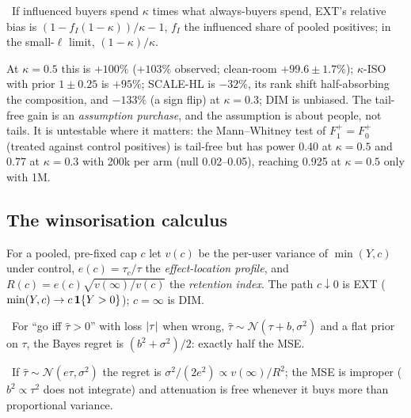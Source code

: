 \begin{proposition}
\label{ht:prop:comp}
\tagEstablished\ If influenced buyers spend $\kappa$ times what always-buyers spend, EXT's relative bias is $(1 - f_I(1 - \kappa))/\kappa - 1$, $f_I$ the influenced share of pooled positives; in the small-$\ell$ limit, $(1 - \kappa)/\kappa$.
\end{proposition}

At $\kappa = 0.5$ this is $+100\%$ ($+103\%$ observed; clean-room $+99.6 \pm 1.7\%$); $\kappa$-ISO with prior $1 \pm 0.25$ is $+95\%$; SCALE-HL is $-32\%$, its rank shift half-absorbing the composition, and $-133\%$ (a sign flip) at $\kappa = 0.3$; DIM is unbiased. The tail-free gain is an \emph{assumption purchase}, and the assumption is about people, not tails. It is untestable where it matters: the Mann--Whitney test of $F_1^+ = F_0^+$ (treated against control positives) is tail-free but has power 0.40 at $\kappa = 0.5$ and 0.77 at $\kappa = 0.3$ with 200k per arm (null 0.02--0.05), reaching 0.925 at $\kappa = 0.5$ only with 1M.

\subsection{The winsorisation calculus}

\begin{definition}
\label{ht:def:retention}
For a pooled, pre-fixed cap $c$ let $v(c)$ be the per-user variance of $\min(Y, c)$ under control, $e(c) = \tau_c/\tau$ the \emph{effect-location profile}, and $R(c) = e(c)\sqrt{v(\infty)/v(c)}$ the \emph{retention index}. The path $c \downarrow 0$ is EXT ($\min(Y, c) \to c\,\mathbf{1}\{Y > 0\}$); $c = \infty$ is DIM.
\end{definition}

\begin{lemma}
\label{ht:lem:A}
\tagEstablished\ For ``go iff $\hat\tau > 0$'' with loss $\left|\tau\right|$ when wrong, $\hat\tau \sim \mathcal N(\tau + b, \sigma^2)$ and a flat prior on $\tau$, the Bayes regret is $(b^2 + \sigma^2)/2$: exactly half the MSE.
\end{lemma}

\begin{lemma}
\label{ht:lem:B}
\tagEstablished\ If $\hat\tau \sim \mathcal N(e\tau, \sigma^2)$ the regret is $\sigma^2/(2e^2) \propto v(\infty)/R^2$; the MSE is improper ($b^2 \propto \tau^2$ does not integrate) and attenuation is free whenever it buys more than proportional variance.
\end{lemma}

